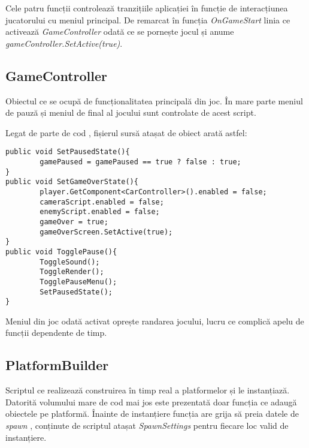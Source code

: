 Cele patru funcții controlează tranzițiile aplicației în funcție de interacțiunea jucatorului cu meniul principal. De remarcat în funcția \textit{OnGameStart} linia ce activează \textit{GameController} odată ce se pornește jocul și anume \textit{gameController.SetActive(true)}.\par

\subsection{GameController}

Obiectul ce se ocupă de funcționalitatea principală din joc. În mare parte meniul de pauză și meniul de final al jocului sunt controlate de acest script.\par

Legat de parte de cod , fișierul sursă atașat de obiect arată astfel:\par

\begin{lstlisting}[caption=Funcțiile din GameController,
  label=a_label]
public void SetPausedState(){
        gamePaused = gamePaused == true ? false : true;
}
public void SetGameOverState(){
        player.GetComponent<CarController>().enabled = false;
        cameraScript.enabled = false;
        enemyScript.enabled = false;
        gameOver = true;
        gameOverScreen.SetActive(true);
}
public void TogglePause(){
        ToggleSound();
        ToggleRender();
        TogglePauseMenu();
        SetPausedState();
}
\end{lstlisting}

Meniul din joc odată activat oprește randarea jocului, lucru ce complică apelu de funcții dependente de timp.\par

\subsection{PlatformBuilder}

Scriptul ce realizează construirea în timp real a platformelor și le instanțiază. Datorită volumului mare de cod mai jos este prezentată doar funcția ce adaugă obiectele pe platformă. Înainte de instanțiere funcția are grija să preia datele de \textit{spawn} , conținute de scriptul atașat \textit{SpawnSettings} pentru fiecare loc valid de instanțiere.\par


